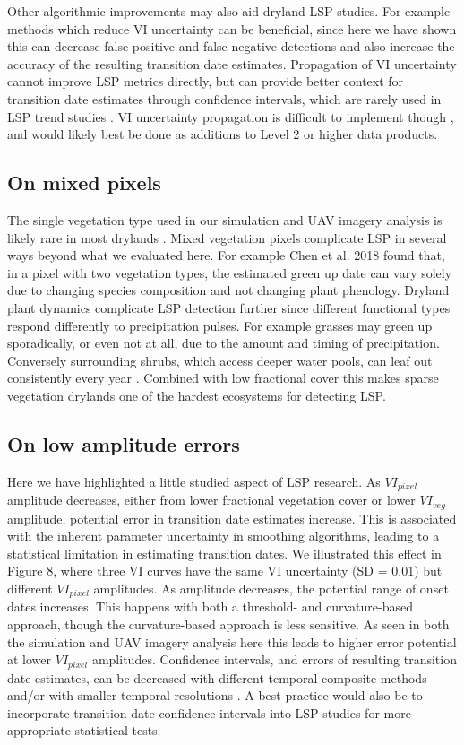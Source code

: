\documentclass{article}
\begin{document}
Other algorithmic improvements may also aid dryland LSP studies. For example methods which reduce VI uncertainty can be beneficial, since here we have shown this can decrease false positive and false negative detections and also increase the accuracy of the resulting transition date estimates. Propagation of VI uncertainty cannot improve LSP metrics directly, but can provide better context for transition date estimates through confidence intervals, which are rarely used in LSP trend studies \cite{cortes2021}. VI uncertainty propagation is difficult to implement though \cite{borgogno-mondino2016}, and would likely best be done as additions to Level 2 or higher data products. 

\subsection{On mixed pixels}

The single vegetation type used in our simulation and UAV imagery analysis is likely rare in most drylands \cite{jones2018}. Mixed vegetation pixels complicate LSP in several ways beyond what we evaluated here. For example Chen et al. 2018 \cite{chen-wang2018} found that, in a pixel with two vegetation types, the estimated green up date can vary solely due to changing species composition and not changing plant phenology. Dryland plant dynamics complicate LSP detection further since different functional types respond differently to precipitation pulses. For example grasses may green up sporadically, or even not at all, due to the amount and timing of precipitation. Conversely surrounding shrubs, which access deeper water pools, can leaf out consistently every year \cite{ogle2004, lauenroth2014, moreno2015}. Combined with low fractional cover this makes sparse vegetation drylands one of the hardest ecosystems for detecting LSP.

\subsection{On low amplitude errors}
Here we have highlighted a little studied aspect of LSP research. As $VI_{pixel}$ amplitude decreases, either from lower fractional vegetation cover or lower $VI_{veg}$ amplitude, potential error in transition date estimates increase. This is associated with the inherent parameter uncertainty in smoothing algorithms, leading to a statistical limitation in estimating transition dates. We illustrated this effect in Figure 8, where three VI curves have the same VI uncertainty (SD = 0.01) but different $VI_{pixel}$ amplitudes. As amplitude decreases, the potential range of onset dates increases. This happens with both a threshold- and curvature-based approach, though the curvature-based approach is less sensitive. As seen in both the simulation and UAV imagery analysis here this leads to higher error potential at lower $VI_{pixel}$ amplitudes. Confidence intervals, and errors of resulting transition date estimates, can be decreased with different temporal composite methods and/or with smaller temporal resolutions \cite{zhang-friedl2009}. A best practice would also be to incorporate transition date confidence intervals into LSP studies for more appropriate statistical tests.
\end{document}
